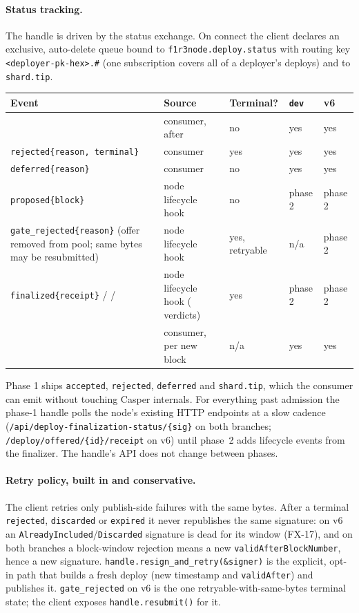 \documentclass[11pt]{article}
\newcommand{\code}[1]{\texttt{#1}}
\newcommand{\dev}{\code{dev}}
\begin{document}
\paragraph{Status tracking.} The handle is driven by the status exchange. On connect
the client declares an exclusive, auto-delete queue bound to
\code{f1r3node.deploy.status} with routing key \code{<deployer-pk-hex>.\#} (one
subscription covers all of a deployer's deploys) and to \code{shard.tip}.
\begin{center}\small
\begin{tabularx}{\textwidth}{X L{3.1cm} L{1.8cm} L{1.3cm} L{1.4cm}}
\toprule
Event & Source & Terminal? & \dev & v6 \\
\midrule
{} & consumer, after  & no & yes & yes \\
\code{rejected\{reason, terminal\}} & consumer & yes & yes & yes \\
\code{deferred\{reason\}} & consumer & no & yes & yes \\
\code{proposed\{block\}} & node lifecycle hook & no & phase 2 & phase 2 \\
\code{gate\_rejected\{reason\}} (offer removed from pool; same bytes may be resubmitted) & node lifecycle hook & yes, retryable & n/a & phase 2 \\
\code{finalized\{receipt\}} /  /  & node lifecycle hook ( verdicts) & yes & phase 2 & phase 2 \\
 & consumer, per new block & n/a & yes & yes \\
\bottomrule
\end{tabularx}
\end{center}
Phase 1 ships \code{accepted}, \code{rejected}, \code{deferred} and \code{shard.tip},
which the consumer can emit without touching Casper internals. For everything past
admission the phase-1 handle polls the node's existing HTTP endpoints at a slow
cadence (\code{/api/deploy-finalization-status/\{sig\}} on both branches;
\code{/deploy/offered/\{id\}/receipt} on v6) until phase~2 adds lifecycle events from
the finalizer. The handle's API does not change between phases.

\paragraph{Retry policy, built in and conservative.} The client retries only
publish-side failures with the same bytes. After a terminal \code{rejected},
\code{discarded} or \code{expired} it never republishes the same signature: on v6 an
\code{AlreadyIncluded}/\code{Discarded} signature is dead for its window (FX-17), and
on both branches a block-window rejection means a new \code{validAfterBlockNumber},
hence a new signature. \code{handle.resign\_and\_retry(\&signer)} is the explicit,
opt-in path that builds a fresh deploy (new timestamp and \code{validAfter}) and
publishes it. \code{gate\_rejected} on v6 is the one retryable-with-same-bytes
terminal state; the client exposes \code{handle.resubmit()} for it.
\end{document}
